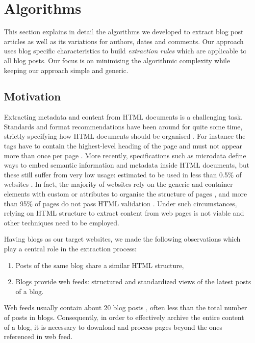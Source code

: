 \section{Algorithms}
\label{algorithms}

This section explains in detail the algorithms we developed to extract blog post articles as well as its variations for authors, dates and comments. Our approach uses blog specific characteristics to build \emph{extraction rules} which are applicable to all blog posts. Our focus is on minimising the algorithmic complexity while keeping our approach simple and generic.


\subsection{Motivation}
\label{motivation}

Extracting metadata and content from HTML documents is a challenging task. Standards and format recommendations have been around for quite some time, strictly specifying how HTML documents should be organised \cite{w3c2014}. For instance the  tags have to contain the highest-level heading of the page and must not appear more than once per page \cite{w3c2002}. More recently, specifications such as microdata \cite{whatwg2014} define ways to embed semantic information and metadata inside HTML documents, but these still suffer from very low usage: estimated to be used in less than 0.5\% of websites \cite{andrewrogers2014}. In fact, the majority of websites rely on the generic  and  container elements with custom  or  attributes to organise the structure of pages \cite{brianwilson2008}, and more than 95\% of pages do not pass HTML validation \cite{brianwilson2008-a}. Under such circumstances, relying on HTML structure to extract content from web pages is not viable and other techniques need to be employed.


Having blogs as our target websites, we made the following observations which play a central role in the extraction process:
\begin{enumerate}[label={(\arabic*)}]
  \item\label{similarhtmlAssum} Posts of the same blog share a similar HTML structure,
  \item\label{havefeedAssum} Blogs provide web feeds: structured and standardized views of the latest posts of a blog.
\end{enumerate}
Web feeds usually contain about 20 blog posts \cite{oita2010}, often less than the total number of posts in blogs. Consequently, in order to effectively archive the entire content of a blog, it is necessary to download and process pages beyond the ones referenced in web feed.


